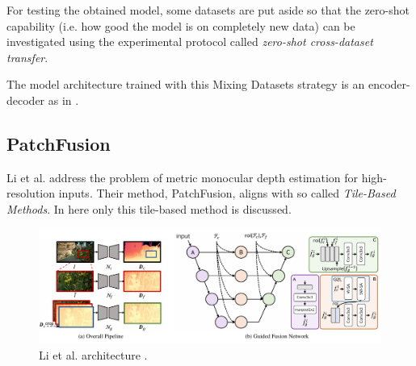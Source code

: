 For testing the obtained model, some datasets are put aside so that the zero-shot capability (i.e. how good the model is on completely new data) can be investigated using the experimental protocol called \textit{zero-shot cross-dataset transfer}.

The model architecture trained with this Mixing Datasets strategy is an encoder-decoder as in \cite{ReDWeb}.

\subsection{PatchFusion}
\label{subsec:patchfusion}
Li et al. \cite{PatchFusion} address the problem of metric monocular depth estimation for high-resolution inputs.
Their method, PatchFusion, aligns with so called \textit{Tile-Based Methods}.
In here only this tile-based method is discussed.

\begin{figure}
	\centering
	\includegraphics[scale=0.3]{figs/patchfusion}
	\caption{Li et al. architecture \cite{PatchFusion}. \label{fig:patchfusion}}
\end{figure}

